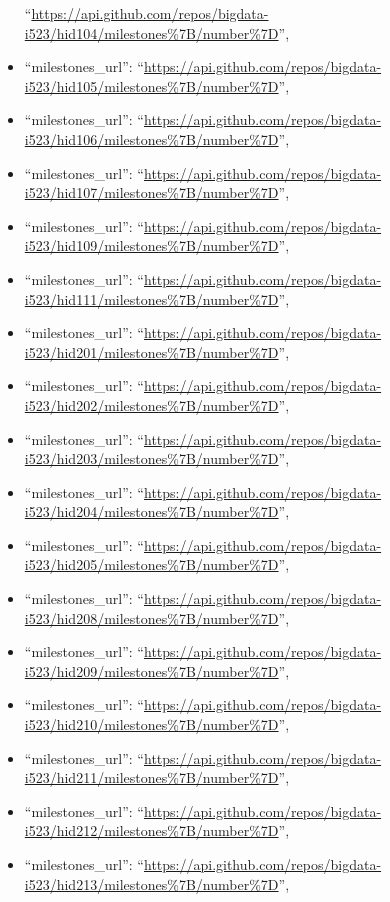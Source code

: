 \begin{itemize}
  ``\url{https://api.github.com/repos/bigdata-i523/hid104/milestones\%7B/number\%7D}'',
\item
  ``milestones\_url'':
  ``\url{https://api.github.com/repos/bigdata-i523/hid105/milestones\%7B/number\%7D}'',
\item
  ``milestones\_url'':
  ``\url{https://api.github.com/repos/bigdata-i523/hid106/milestones\%7B/number\%7D}'',
\item
  ``milestones\_url'':
  ``\url{https://api.github.com/repos/bigdata-i523/hid107/milestones\%7B/number\%7D}'',
\item
  ``milestones\_url'':
  ``\url{https://api.github.com/repos/bigdata-i523/hid109/milestones\%7B/number\%7D}'',
\item
  ``milestones\_url'':
  ``\url{https://api.github.com/repos/bigdata-i523/hid111/milestones\%7B/number\%7D}'',
\item
  ``milestones\_url'':
  ``\url{https://api.github.com/repos/bigdata-i523/hid201/milestones\%7B/number\%7D}'',
\item
  ``milestones\_url'':
  ``\url{https://api.github.com/repos/bigdata-i523/hid202/milestones\%7B/number\%7D}'',
\item
  ``milestones\_url'':
  ``\url{https://api.github.com/repos/bigdata-i523/hid203/milestones\%7B/number\%7D}'',
\item
  ``milestones\_url'':
  ``\url{https://api.github.com/repos/bigdata-i523/hid204/milestones\%7B/number\%7D}'',
\item
  ``milestones\_url'':
  ``\url{https://api.github.com/repos/bigdata-i523/hid205/milestones\%7B/number\%7D}'',
\item
  ``milestones\_url'':
  ``\url{https://api.github.com/repos/bigdata-i523/hid208/milestones\%7B/number\%7D}'',
\item
  ``milestones\_url'':
  ``\url{https://api.github.com/repos/bigdata-i523/hid209/milestones\%7B/number\%7D}'',
\item
  ``milestones\_url'':
  ``\url{https://api.github.com/repos/bigdata-i523/hid210/milestones\%7B/number\%7D}'',
\item
  ``milestones\_url'':
  ``\url{https://api.github.com/repos/bigdata-i523/hid211/milestones\%7B/number\%7D}'',
\item
  ``milestones\_url'':
  ``\url{https://api.github.com/repos/bigdata-i523/hid212/milestones\%7B/number\%7D}'',
\item
  ``milestones\_url'':
  ``\url{https://api.github.com/repos/bigdata-i523/hid213/milestones\%7B/number\%7D}'',

\end{itemize}
